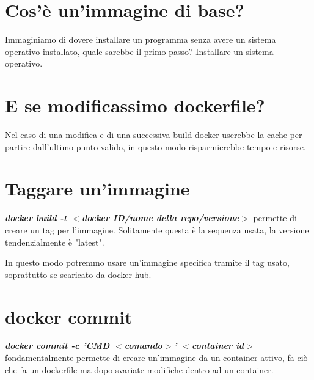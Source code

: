 \documentclass[11pt,a4paper]{book}
\begin{document}
\section{Cos'è un'immagine di base?}
Immaginiamo di dovere installare un programma senza avere un sistema operativo installato, quale sarebbe il primo passo? Installare un sistema operativo.

\section{E se modificassimo dockerfile?}
Nel caso di una modifica e di una successiva build docker userebbe la cache per partire dall'ultimo punto valido, in questo modo risparmierebbe tempo e risorse.

\section{Taggare un'immagine}
\emph{\textbf{docker build -t $<$docker ID/nome della repo/versione$>$}} permette di creare un tag per l'immagine. Solitamente questa è la sequenza usata, la versione tendenzialmente è "latest".

In questo modo potremmo usare un'immagine specifica tramite il tag usato, soprattutto se scaricato da docker hub.

\section{docker commit}
\emph{\textbf{docker commit -c 'CMD $<$comando$>$' $<$container id$>$}} fondamentalmente permette di creare un'immagine da un container attivo, fa ciò che fa un dockerfile ma dopo svariate modifiche dentro ad un container.
\end{document}
